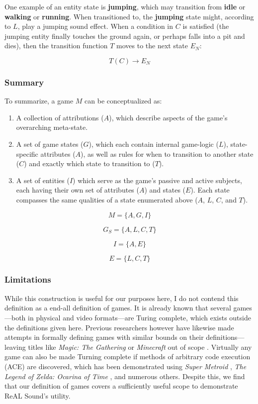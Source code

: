 \documentclass{report}
\newcommand{\rs}{ReAL Sound\xspace}
\begin{document}
One example of an entity state is \textbf{jumping}, which may transition from \textbf{idle} or \textbf{walking} or \textbf{running}. When transitioned to, the \textbf{jumping} state might, according to $L$, play a jumping sound effect. When a condition in $C$ is satisfied (the jumping entity finally touches the ground again, or perhaps falls into a pit and dies), then the transition function $T$ moves to the next state $E_N$:

$$T(C) \longrightarrow E_N$$

\subsubsection{Summary}
To summarize, a game $M$ can be conceptualized as:

\begin{enumerate}
    \item A collection of attributions ($A$), which describe aspects of the game's overarching meta-state.
    \item A set of game states ($G$), which each contain internal game-logic ($L$), state-specific attributes ($A$), as well as rules for when to transition to another state ($C$) and exactly which state to transition to ($T$).   
    \item A set of entities ($I$) which serve as the game's passive and active subjects, each having their own set of attributes ($A$) and states ($E$). Each state compasses the same qualities of a state enumerated above ($A$, $L$, $C$, and $T$).   
\end{enumerate}

$$
M = \{A, G, I\}
$$

$$
G_S = \{ A, L, C, T \}
$$

$$I = \{A, E\}$$

$$E = \{L, C, T\}$$


\subsubsection{Limitations}
While this construction is useful for our purposes here, I do not contend this definition as a end-all definition of games. It is already known that several games---both in physical and video formats---are Turing complete, which exists outside the definitions given here. Previous researchers however have likewise made attempts in formally defining games with similar bounds on their definitions---leaving titles like \emph{Magic: The Gathering} \cite{churchill2019magicgatheringturingcomplete} or \emph{Minecraft} \cite{Hildreth1980} out of scope \cite{Demaine}. Virtually any game can also be made Turning complete if methods of arbitrary code execution (ACE) are discovered, which has been demonstrated using \emph{Super Metroid} \cite{Mawhorter_Aytemiz_Karth_Smith_2021}, \emph{The Legend of Zelda: Ocarina of Time} \cite{OoT}, and numerous others. Despite this, we find that our definition of games covers a sufficiently useful scope to demonstrate \rs's utility.
\end{document}

